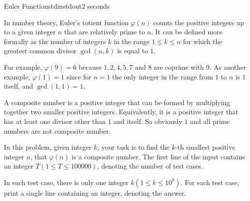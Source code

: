 \documentclass[11pt,a4paper,oneside]{article}
\newcommand{\timeLimit}{2 seconds}
\renewcommand{\defaultmemorylimit}{512 megabytes}
\begin{document}
\begin{problem}{Euler Function}{stdin}{stdout}{\timeLimit}

In number theory, Euler's totient function $\varphi(n)$ counts the positive integers up to a given integer $n$ that are relatively prime to $n$. It can be defined more formally as the number of integers $k$ in the range $1\leq k\leq n$ for which the greatest common divisor $\gcd(n, k)$ is equal to $1$.\par
For example, $\varphi(9) = 6$ because $1, 2, 4, 5, 7$ and $8$ are coprime with $9$. As another example, $\varphi(1) = 1$ since for $n = 1$ the only integer in the range from $1$ to $n$ is $1$ itself, and $\gcd(1, 1) = 1$.\par
A composite number is a positive integer that can be formed by multiplying together two smaller positive integers. Equivalently, it is a positive integer that has at least one divisor other than $1$ and itself. So obviously $1$ and all prime numbers are not composite number.\par
In this problem, given integer $k$, your task is to find the $k$-th smallest positive integer $n$, that $\varphi(n)$ is a composite number.
\InputFile
The first line of the input contains an integer $T(1\leq T\leq100000)$, denoting the number of test cases.\par
In each test case, there is only one integer $k(1\leq k\leq 10^9)$.
\OutputFile
For each test case, print a single line containing an integer, denoting the answer.

\Examples
\begin{example}
%
\end{example}
\end{problem}
\renewcommand{\timeLimit}{3 seconds}
\renewcommand{\defaultmemorylimit}{512 megabytes}
\end{document}
